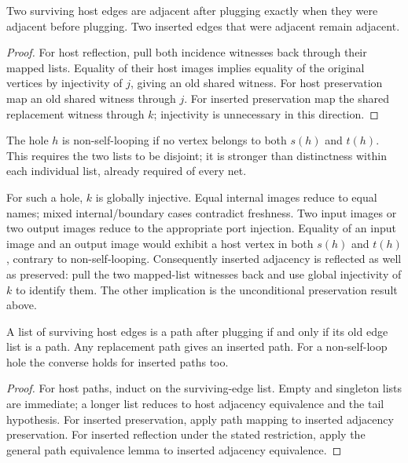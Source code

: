 \begin{lemma}
Two surviving host edges are adjacent after plugging exactly when they were
adjacent before plugging. Two inserted edges that were adjacent remain adjacent.
\end{lemma}
\begin{proof}
For host reflection, pull both incidence witnesses back through their mapped
lists. Equality of their host images implies equality of the original vertices
by injectivity of $j$, giving an old shared witness. For host preservation map
an old shared witness through $j$. For inserted preservation map the shared
replacement witness through $k$; injectivity is unnecessary in this direction.
\end{proof}
\begin{definition}\label{term:non-self-loop}
The hole $h$ is non-self-looping if no vertex belongs to both $s(h)$ and $t(h)$.
This requires the two lists to be disjoint; it is stronger than distinctness
within each individual list, already required of every net.
\end{definition}
For such a hole, $k$ is globally injective. Equal internal images reduce to equal
names; mixed internal/boundary cases contradict freshness. Two input images or
two output images reduce to the appropriate port injection. Equality of an
input image and an output image would exhibit a host vertex in both $s(h)$ and
$t(h)$, contrary to non-self-looping.
Consequently inserted adjacency is reflected as well as preserved: pull the two
mapped-list witnesses back and use global injectivity of $k$ to identify them.
The other implication is the unconditional preservation result above.

\begin{theorem}
A list of surviving host edges is a path after plugging if and only if its old
edge list is a path. Any replacement path gives an inserted path. For a
non-self-loop hole the converse holds for inserted paths too.
\end{theorem}
\begin{proof}
For host paths, induct on the surviving-edge list. Empty and singleton lists
are immediate; a longer list reduces to host adjacency equivalence and the tail
hypothesis. For inserted preservation, apply path mapping to inserted adjacency
preservation. For inserted reflection under the stated restriction, apply the
general path equivalence lemma to inserted adjacency equivalence.
\end{proof}


